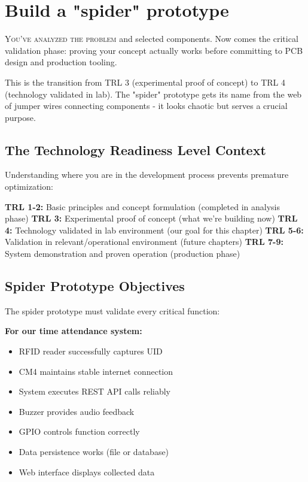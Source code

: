 \chapter{Build a "spider" prototype}

\lettrine{Y}{ou've analyzed the problem} and selected components. Now comes the critical validation phase: proving your concept actually works before committing to PCB design and production tooling.

This is the transition from TRL 3 (experimental proof of concept) to TRL 4 (technology validated in lab). The "spider" prototype gets its name from the web of jumper wires connecting components - it looks chaotic but serves a crucial purpose.

\section{The Technology Readiness Level Context}

Understanding where you are in the development process prevents premature optimization:

\textbf{TRL 1-2:} Basic principles and concept formulation (completed in analysis phase)
\textbf{TRL 3:} Experimental proof of concept (what we're building now)
\textbf{TRL 4:} Technology validated in lab environment (our goal for this chapter)
\textbf{TRL 5-6:} Validation in relevant/operational environment (future chapters)
\textbf{TRL 7-9:} System demonstration and proven operation (production phase)

\section{Spider Prototype Objectives}

The spider prototype must validate every critical function:

\textbf{For our time attendance system:}
\begin{itemize}
\item RFID reader successfully captures UID
\item CM4 maintains stable internet connection
\item System executes REST API calls reliably
\item Buzzer provides audio feedback
\item GPIO controls function correctly
\item Data persistence works (file or database)
\item Web interface displays collected data
\end{itemize}

